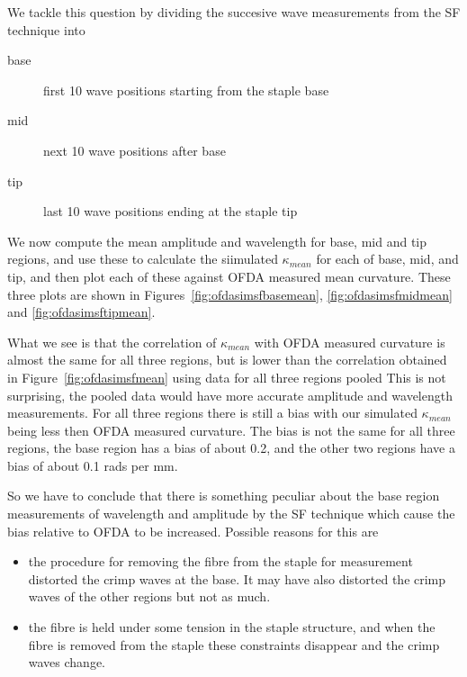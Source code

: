 \documentclass[titlepage,10pt]{article}  %
\begin{document}
We tackle this question by dividing the succesive wave measurements from the SF technique into 
\begin{description}
\item[base] first 10 wave positions starting from the staple base
\item[mid] next 10 wave positions after base
\item[tip] last 10 wave positions ending at the staple tip
\end{description} 
We now compute the mean amplitude and wavelength for base, mid and tip regions, and use these to calculate the siimulated $\kappa_{mean}$ for each of base, mid, and tip, and then plot each of these against OFDA measured mean curvature. These three plots are shown in Figures~\ref{fig:ofdasimsfbasemean}, \ref{fig:ofdasimsfmidmean} and \ref{fig:ofdasimsftipmean}.



What we see is that the correlation of $\kappa_{mean}$ with OFDA measured curvature is almost the same for all three regions, but is lower than the correlation obtained in Figure~\ref{fig:ofdasimsfmean} using data for all three regions pooled This is not surprising, the pooled data would have more accurate amplitude and wavelength measurements. For all three regions there is still a bias with our simulated $\kappa_{mean}$ being less then OFDA measured curvature. The bias is not the same for all three regions, the base region has a bias of about 0.2, and the other two regions have a bias of about 0.1 rads per mm.

So we have to conclude that there is something peculiar about the base region measurements of wavelength and amplitude by the SF technique which cause the bias relative to OFDA to be increased. Possible reasons for this are
\begin{itemize}
\item the procedure for removing the fibre from the staple for measurement distorted the crimp waves at the base. It may have also distorted the crimp waves of the other regions but not as much.
\item the fibre is held under some tension in the staple structure, and when the fibre is removed from the staple these constraints disappear and the crimp waves change. 
\end{itemize}
\end{document}
